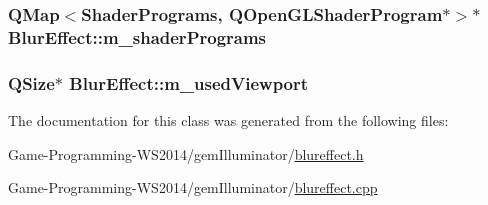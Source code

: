 \subsubsection[{m\+\_\+shader\+Programs}]{\setlength{\rightskip}{0pt plus 5cm}Q\+Map$<${\bf Shader\+Programs}, Q\+Open\+G\+L\+Shader\+Program$\ast$$>$$\ast$ Blur\+Effect\+::m\+\_\+shader\+Programs\hspace{0.3cm}{\ttfamily [protected]}}\label{class_blur_effect_a36f1750676d9a4b935609300a2c8853c}
\hypertarget{class_blur_effect_a8513aa58d2ff05cc6b135f60c25d0710}{}
\subsubsection[{m\+\_\+used\+Viewport}]{\setlength{\rightskip}{0pt plus 5cm}Q\+Size$\ast$ Blur\+Effect\+::m\+\_\+used\+Viewport\hspace{0.3cm}{\ttfamily [protected]}}\label{class_blur_effect_a8513aa58d2ff05cc6b135f60c25d0710}


The documentation for this class was generated from the following files\+:\begin{DoxyCompactItemize}
\item 
Game-\/\+Programming-\/\+W\+S2014/gem\+Illuminator/\hyperlink{blureffect_8h}{blureffect.\+h}\item 
Game-\/\+Programming-\/\+W\+S2014/gem\+Illuminator/\hyperlink{blureffect_8cpp}{blureffect.\+cpp}\end{DoxyCompactItemize}
